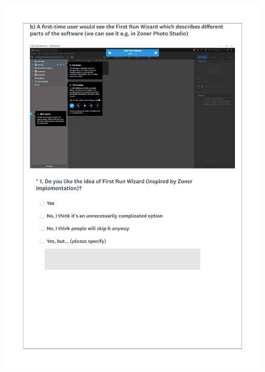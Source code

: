 \documentclass[a4paper,10pt,twoside]{article}
\begin{document}
 \newpage
 \begin{figure}[hbt!]
 \begin{center}
 \includegraphics[width=15.5cm]{../surveys/questionnaires/survey1_part2_page3_questions1.pdf}
 \end{center}
 \end{figure}
 
\end{document}
